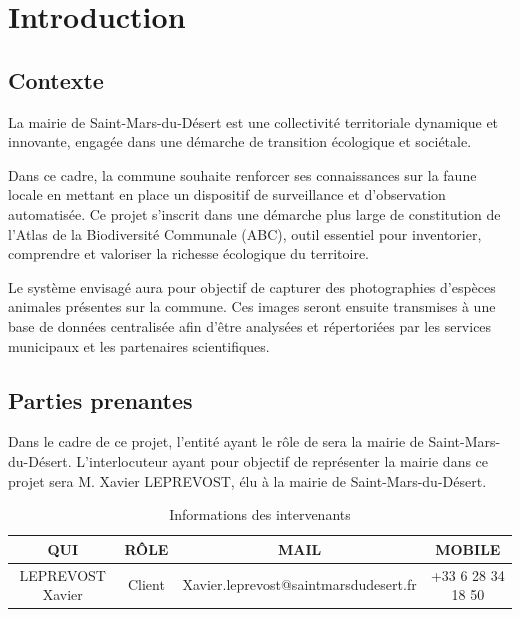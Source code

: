 \section{Introduction}
\small

\subsection{Contexte}
La mairie de Saint-Mars-du-Désert est une collectivité territoriale dynamique et innovante, engagée dans une démarche de transition écologique et sociétale.
\newline

Dans ce cadre, la commune souhaite renforcer ses connaissances sur la faune locale en mettant en place un dispositif de surveillance et d'observation automatisée.
Ce projet s'inscrit dans une démarche plus large de constitution de l'Atlas de la Biodiversité Communale (ABC), outil essentiel pour inventorier, comprendre et valoriser la richesse écologique du territoire.
\newline

Le système envisagé aura pour objectif de capturer des photographies d'espèces animales présentes sur la commune.
Ces images seront ensuite transmises à une base de données centralisée afin d'être analysées et répertoriées par les services municipaux et les partenaires scientifiques.
\newline

\subsection{Parties prenantes}
Dans le cadre de ce projet, l'entité ayant le rôle de  sera la mairie de Saint-Mars-du-Désert.
L'interlocuteur ayant pour objectif de représenter la mairie dans ce projet sera M. Xavier LEPREVOST, élu à la mairie de Saint-Mars-du-Désert.
\newline

\begin{table}[h!]
    \centering
    \renewcommand{\arraystretch}{1.2} %
    \begin{tabular}{|c|c|c|c|}
        \hline
        \textbf{QUI}     & \textbf{RÔLE} & \textbf{MAIL}                         & \textbf{MOBILE}   \\
        \hline
        LEPREVOST Xavier & Client        & Xavier.leprevost@saintmarsdudesert.fr & +33 6 28 34 18 50 \\
        \hline
    \end{tabular}
    \caption{Informations des intervenants}
    \label{tab:intervenants}
\end{table}


